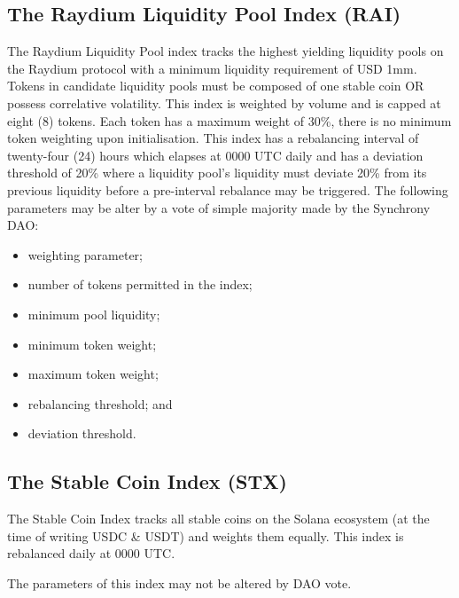 \documentclass[10pt]{article}
\begin{document}
					\subsection{The Raydium Liquidity Pool Index (RAI)}
					The Raydium Liquidity Pool index tracks the highest yielding liquidity pools on
					the Raydium protocol with a minimum liquidity requirement of USD 1mm. Tokens in
					candidate liquidity pools must be composed of one stable coin OR possess
					correlative volatility. This index
					is weighted by volume and is capped at eight (8) tokens. Each token has a maximum
					weight of 30\%, there is no minimum token weighting upon initialisation. This
					index has a rebalancing interval of twenty-four (24) hours which elapses at 0000
					UTC daily and has a deviation threshold of 20\% where a liquidity pool's
					liquidity must deviate 20\% from its previous liquidity before a pre-interval
					rebalance may be triggered. The following parameters may be alter by a vote of
					simple majority made by the Synchrony DAO:
					\begin{itemize}
						\item weighting parameter;
						\item number of tokens permitted in the index;
						\item minimum pool liquidity;
						\item minimum token weight;
						\item maximum token weight;
						\item rebalancing threshold; and
						\item deviation threshold.
					\end{itemize}

					\subsection{The Stable Coin Index (STX)}
					The Stable Coin Index tracks all stable coins on the Solana ecosystem (at the
					time of writing USDC \& USDT) and weights them equally. This index is rebalanced
					daily at 0000 UTC.

					The parameters of this index may not be altered by DAO vote.
\end{document}
